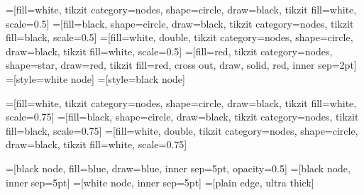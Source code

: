 

=[fill=white, tikzit category=nodes, shape=circle,
  draw=black, tikzit fill=white, scale=0.5]
=[fill=black, shape=circle, draw=black,
  tikzit category=nodes, tikzit fill=black, scale=0.5]
=[fill=white, double, tikzit category=nodes,
  shape=circle, draw=black, tikzit fill=white, scale=0.5]
=[fill=red, tikzit category=nodes, shape=star,
  draw=red, tikzit fill=red, cross out, draw, solid, red, inner sep=2pt]
=[style=white node]
=[style=black node]

=[fill=white, tikzit category=nodes,
  shape=circle, draw=black, tikzit fill=white, scale=0.75]
=[fill=black, shape=circle, draw=black,
  tikzit category=nodes, tikzit fill=black, scale=0.75]
=[fill=white, double, tikzit category=nodes,
  shape=circle, draw=black, tikzit fill=white, scale=0.75]

=[black node, fill=blue, draw=blue,
  inner sep=5pt, opacity=0.5]
=[black node, inner sep=5pt]
=[white node, inner sep=5pt]
=[plain edge, ultra thick]

